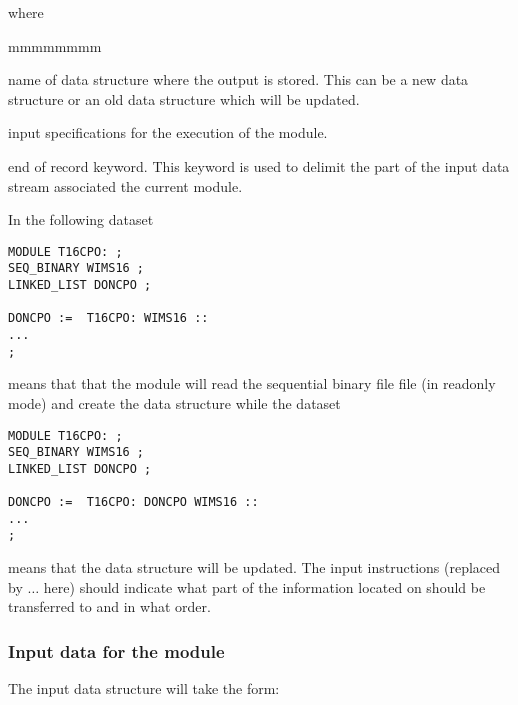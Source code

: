 \noindent where

\begin{ListeDeDescription}{mmmmmmmm}

\item[\moc{DONCPO}]  name of data structure where the output  is stored. This can be a new data structure
or an old data structure which will be updated. 

\item[\dstr{desct16cpo}] input specifications for the execution of the  module.  

\item[\moc{;}] end of record keyword. This keyword is used to
delimit the part of the input data stream associated the current module.

\end{ListeDeDescription}

\noindent In the following dataset
\begin{verbatim}
MODULE T16CPO: ;
SEQ_BINARY WIMS16 ;
LINKED_LIST DONCPO ;

DONCPO :=  T16CPO: WIMS16 ::
...
;
\end{verbatim}
means that that the module will read the sequential binary file  file (in readonly mode) and
create the  data structure  while the dataset
\begin{verbatim}
MODULE T16CPO: ;
SEQ_BINARY WIMS16 ;
LINKED_LIST DONCPO ;

DONCPO :=  T16CPO: DONCPO WIMS16 ::
...
;
\end{verbatim}
means that the data structure  will be updated. The input instructions (replaced by $\ldots$ here)
should indicate what part of the information located on  should be transferred to
 and in what order.

\subsubsection{Input data for the  module}

The input data structure  will take the form:

